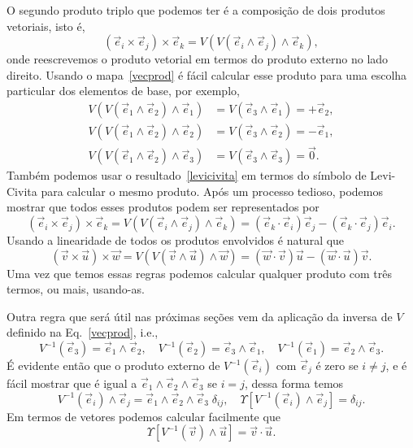O segundo produto triplo que podemos ter é a composição de dois produtos
vetoriais, isto é,
\begin{equation*}
	(\vec{e}_i\times\vec{e}_j)\times\vec{e}_k = V\left(V\left(\vec{e}_i\wedge\vec{e}_j\right)\wedge\vec{e}_k\right),
\end{equation*}
onde reescrevemos o produto vetorial em termos do produto externo no lado
direito. Usando o mapa~\eqref{vecprod} é fácil calcular esse produto para uma
escolha particular dos elementos de base, por exemplo,
\begin{align*}
	V\left(V\left(\vec{e}_1\wedge\vec{e}_2\right)\wedge\vec{e}_1\right) & = V\left(\vec{e}_3\wedge\vec{e}_1\right) = +\vec{e}_2, \\ V\left(V\left(\vec{e}_1\wedge\vec{e}_2\right)\wedge\vec{e}_2\right) &= V\left(\vec{e}_3\wedge\vec{e}_2\right) = -\vec{e}_1, \\
	V\left(V\left(\vec{e}_1\wedge\vec{e}_2\right)\wedge\vec{e}_3\right) & = V\left(\vec{e}_3\wedge\vec{e}_3\right) = \vec{0}.
\end{align*}
Também podemos usar o resultado~\eqref{levicivita} em termos do símbolo de
Levi-Civita para calcular o mesmo produto. Após um processo tedioso, podemos
mostrar que todos esses produtos podem ser representados por
\begin{equation}\label{TT}
	(\vec{e}_i\times\vec{e}_j)\times\vec{e}_k = V\left(V\left(\vec{e}_i\wedge\vec{e}_j\right)\wedge\vec{e}_k\right) = \left(\vec{e}_k\cdot\vec{e}_i\right)\vec{e}_j-\left(\vec{e}_k\cdot\vec{e}_j\right)\vec{e}_i.
\end{equation}
Usando a linearidade de todos os produtos envolvidos é natural que
\begin{equation}\label{vprod2}
	\left(\vec{v}\times\vec{u}\right)\times\vec{w} = V\left(V\left(\vec{v}\wedge\vec{u}\right)\wedge\vec{w}\right) = \left(\vec{w}\cdot\vec{v}\right)\vec{u}-\left(\vec{w}\cdot\vec{u}\right)\vec{v}.
\end{equation}
Uma vez que temos essas regras podemos calcular qualquer produto com três
termos, ou mais, usando-as.

Outra regra que será útil nas próximas seções vem da aplicação da inversa de
$V$ definido na Eq.~\eqref{vecprod}, i.e.,
\begin{equation}
	V^{-1}(\vec{e}_3) = \vec{e}_1\wedge\vec{e}_2, \quad V^{-1}(\vec{e}_2) = \vec{e}_3\wedge\vec{e}_1, \quad V^{-1}(\vec{e}_1) = \vec{e}_2\wedge\vec{e}_3.
\end{equation}
É evidente então que o produto externo de $V^{-1}(\vec{e}_i)$ com $\vec{e}_j$ é
zero se $i\neq j$, e é fácil mostrar que é igual a
$\vec{e}_1\wedge\vec{e}_2\wedge\vec{e}_3$ se $i=j$, dessa forma temos
\begin{equation}
	V^{-1}(\vec{e}_i)\wedge\vec{e}_j = \vec{e}_1\wedge\vec{e}_2\wedge\vec{e}_3\; \delta_{ij}, \quad \Upsilon\left[V^{-1}(\vec{e}_i)\wedge\vec{e}_j\right] = \delta_{ij}.
\end{equation}
Em termos de vetores podemos calcular facilmente que
\begin{equation}\label{UVm1}
	\Upsilon\left[V^{-1}(\vec{v})\wedge\vec{u}\right] = \vec{v}\cdot\vec{u}.
\end{equation}

